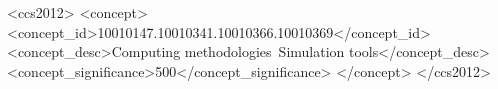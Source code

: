 
\begin{CCSXML}
	<ccs2012>
	<concept>
	<concept_id>10010147.10010341.10010366.10010369</concept_id>
	<concept_desc>Computing methodologies~Simulation tools</concept_desc>
	<concept_significance>500</concept_significance>
	</concept>
	</ccs2012>
\end{CCSXML}


\printccsdesc

